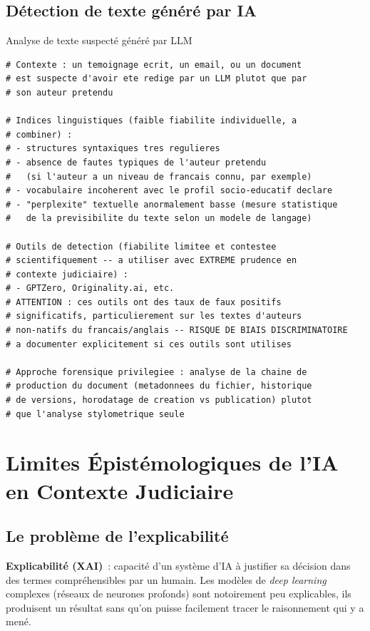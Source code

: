 \subsection{Détection de texte généré par IA}

\begin{boxoutils}{Analyse de texte suspecté généré par LLM}
\begin{lstlisting}[language=bash_forensique]
# Contexte : un temoignage ecrit, un email, ou un document
# est suspecte d'avoir ete redige par un LLM plutot que par
# son auteur pretendu

# Indices linguistiques (faible fiabilite individuelle, a
# combiner) :
# - structures syntaxiques tres regulieres
# - absence de fautes typiques de l'auteur pretendu
#   (si l'auteur a un niveau de francais connu, par exemple)
# - vocabulaire incoherent avec le profil socio-educatif declare
# - "perplexite" textuelle anormalement basse (mesure statistique
#   de la previsibilite du texte selon un modele de langage)

# Outils de detection (fiabilite limitee et contestee
# scientifiquement -- a utiliser avec EXTREME prudence en
# contexte judiciaire) :
# - GPTZero, Originality.ai, etc.
# ATTENTION : ces outils ont des taux de faux positifs
# significatifs, particulierement sur les textes d'auteurs
# non-natifs du francais/anglais -- RISQUE DE BIAIS DISCRIMINATOIRE
# a documenter explicitement si ces outils sont utilises

# Approche forensique privilegiee : analyse de la chaine de
# production du document (metadonnees du fichier, historique
# de versions, horodatage de creation vs publication) plutot
# que l'analyse stylometrique seule
\end{lstlisting}
\end{boxoutils}

\section{Limites Épistémologiques de l'IA en Contexte Judiciaire}
\label{sec:limites-ia}

\subsection{Le problème de l'explicabilité}

\begin{boxdef}
\textbf{Explicabilité (XAI)}~: capacité d'un
système d'IA à justifier sa décision dans des termes compréhensibles
par un humain. Les modèles de \textit{deep learning} complexes
(réseaux de neurones profonds) sont notoirement peu explicables, ils produisent un résultat sans qu'on puisse facilement tracer
le raisonnement qui y a mené.
\end{boxdef}

